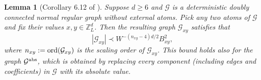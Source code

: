 \documentclass{article}
\newcommand{\1}{\mathds{1}}
\numberwithin{equation}{section}
\newcommand{\ord}{{\rm{ord}}}
\newcommand{\al}{\alpha}
\newcommand{\be}{\begin{equation}}
\newcommand{\ee}{\end{equation}}
\renewcommand{\cal}{\mathcal}
\renewcommand{\geq}{\geqslant}
\renewcommand{\ge}{\geq}
\newcommand{\Z}{\mathbb{Z}}
\theoremstyle{plain} %
\newtheorem{lemma}[theorem]{Lemma}
\theoremstyle{remark}
\begin{document}
\begin{lemma}[Corollary 6.12 of \cite{PartI_high}]\label{lem Rdouble}
	Suppose $d\ge 6$ and $\cal G$ is a deterministic doubly connected normal regular graph without external atoms. Pick any two atoms of $\cal G$ and fix their values $x , y\in \Z_L^d$. Then the resulting graph $\cal G_{xy}$ satisfies that
	\be\label{bound 2net1B}
	\left|\cal G_{xy}\right| \prec W^{ - \left(n_{xy} -4\right) d/2} B_{xy}^2 ,
	\ee
	where $n_{xy}:=\ord(\cal G_{xy})$ is the scaling order of $\cal G_{xy}$. This bound holds also for the graph $ {\cal G}^{{\rm abs}}$, which is obtained by replacing every component (including edges and coefficients) in $\cal G$ with its absolute value. 
\end{lemma}


%
\end{document}
